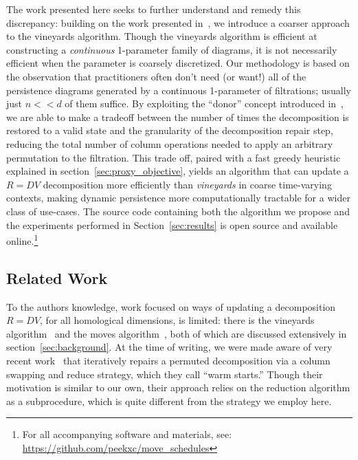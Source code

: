 \documentclass[sn-mathphys]{sn-jnl}
\begin{document}
The work presented here seeks to further understand and remedy this discrepancy: building on the work presented in~\cite{busaryev2010tracking}, we introduce a coarser approach to the vineyards algorithm.
Though the vineyards algorithm is efficient at constructing a \emph{continuous} 1-parameter family of diagrams, it is not necessarily efficient when the parameter is coarsely discretized.
Our methodology is based on the observation that practitioners often don't need (or want!) all of the persistence diagrams generated by a continuous 1-parameter of filtrations; usually just $n << d$ of them  suffice.   
By exploiting the ``donor'' concept introduced in~\cite{busaryev2010tracking}, we are able to make a tradeoff between the number of times the decomposition is restored to a valid state and the granularity of the decomposition repair step, reducing the total number of column operations needed to apply an arbitrary permutation to the filtration. This trade off, paired with a fast greedy heuristic explained in section~\ref{sec:proxy_objective}, yields an algorithm that can update a $R = DV$ decomposition more efficiently than \emph{vineyards} in coarse time-varying contexts, making dynamic persistence more computationally tractable for a wider class of use-cases. 
The source code containing both the algorithm we propose and the experiments performed in Section~\ref{sec:results} is open source and available online.\footnote{ For all accompanying software and materials, see: \url{https://github.com/peekxc/move_schedules}}
  
\subsection{Related Work}\label{sec:related_work} 
To the authors knowledge, work focused on ways of updating a  decomposition $R = DV$, for all homological dimensions, is limited: there is the vineyards algorithm~\cite{cohen2006vines} and the moves algorithm~\cite{busaryev2010tracking}, both of which are discussed extensively in section~\ref{sec:background}. At the time of writing, we were made aware of very recent work~\cite{luo2021accelerating} that iteratively repairs a permuted decomposition via a column swapping and reduce strategy, which they call ``warm starts.'' Though their motivation is similar to our own, their approach relies on the reduction algorithm as a subprocedure, which is quite different from the strategy we employ here.
\end{document}
